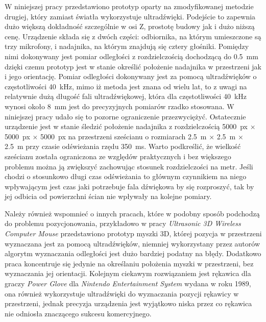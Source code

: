  W niniejszej pracy przedstawiono prototyp oparty na zmodyfikowanej metodzie drugiej, który zamiast światła wykorzystuje ultradźwięki. 
 Podejście to zapewnia dużo większą dokładność szczególnie w osi Z, prostotę budowy jak i dużo niższą cenę.
 Urządzenie składa się z dwóch części: odbiornika, na którym umieszczone są trzy mikrofony, i nadajnika,
 na którym znajdują się cztery głośniki. Pomiędzy nimi dokonywany jest pomiar odległości z rozdzielczością
 dochodzącą do \SI{0,5}{mm} dzięki czemu prototyp jest w stanie określić położenie nadajnika
w przestrzeni jak i jego orientację. 
Pomiar odległości dokonywany jest za pomocą ultradźwięków o częstotliwości \SI{40}{kHz},
mimo iż metoda jest znana od wielu lat, to z uwagi na relatywnie dużą długość fali ultradźwiękowej,
która dla częstotliwości \SI{40}{kHz} wynosi około \SI{8}{mm} jest do precyzyjnych pomiarów rzadko stosowana.
W niniejszej pracy udało się to pozorne ograniczenie przezwyciężyć.
Ostatecznie urządzenie jest w stanie śledzić położenie nadajnika z rozdzielczością 
\SI{5000}{px} $\times$ \SI{5000}{px} $\times$ \SI{5000}{px} na przestrzeni sześcianu o rozmiarach 
\SI{2,5}{m} $\times$ \SI{2,5}{m}  $\times$ \SI{2,5}{m} przy czasie odświeżania rzędu \SI{350}{ms}.
Warto podkreślić, że wielkość sześcianu została ograniczona ze względów praktycznych i bez 
większego problemu można ją zwiększyć zachowując stosunek rozdzielczości na metr.
Jeśli chodzi o stosunkowo długi czas odświeżania to
 głównym czynnikiem na niego wpływającym jest czas jaki potrzebuje fala dźwiękowa by się rozproszyć,
 tak by jej odbicia od powierzchni ścian nie wpływały na kolejne pomiary.

Należy również wspomnieć o innych pracach, które w podobny sposób podchodzą do problemu pozycjonowania, przykładowo 
w pracy \textit{Ultrasonic 3D Wireless Computer Mouse} \cite{bib:mouse} przedstawiono prototyp myszki 3D, której
pozycja w przestrzeni wyznaczana jest za pomocą ultradźwięków, niemniej wykorzystany przez autorów algorytm wyznaczania 
odległości jest dużo bardziej podatny na błędy. Dodatkowo praca koncentruje się jedynie
na określaniu położenia myszki w przestrzeni, bez wyznaczania jej orientacji.
Kolejnym ciekawym rozwiązaniem jest rękawica dla graczy 
\textit{Power Glove} \cite{bib:powerGlove} \cite{bib:powerGlove2} dla
\textit{Nintendo Entertainment System} wydana w roku 1989, ona również wykorzystuje ultradźwięki do wyznaczania pozycji
rękawicy w przestrzeni, jednak precyzja urządzenia jest wyjątkowo niska przez co rękawica nie odniosła znaczącego sukcesu komercyjnego.


